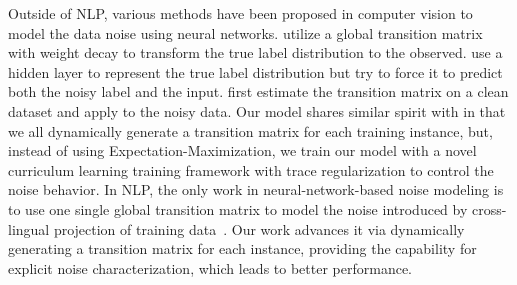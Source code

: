 
Outside of NLP, various methods have been proposed in computer vision  to
 model the data noise using neural networks.
\cite{sukhbaatar2014training}  utilize a global transition matrix with weight decay to transform the true label distribution to
the observed.  %
\cite{reed2014training} use a hidden layer to represent the true label distribution but try to force it to predict both the noisy label and the input. \cite{chen2015webly,xiao2015learning} first estimate the transition matrix on a clean dataset and apply to the noisy data.
Our model shares similar spirit with \cite{misra2016seeing} in that we all dynamically generate a transition matrix for each
training instance, but, instead of using Expectation-Maximization, we train our model with a novel curriculum learning training framework with trace regularization to control the noise behavior.
In NLP, the only work in neural-network-based noise modeling is to use one single global transition matrix to model the noise introduced by
cross-lingual projection of training data~\cite{fang2016learning}.
 Our work advances it via dynamically generating a transition matrix for each instance, providing the capability for explicit noise characterization,
 which leads to better performance. 
 



